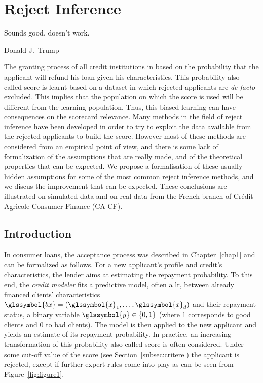 
\chapter{Reject Inference} \label{chap2}

\epigraph{Sounds good, doesn't work.}{Donald J.\ Trump}

\minitoc


\bigskip

The granting process of all credit institutions in based on the probability that the applicant will refund his loan given his characteristics. This probability also called \gls{score} is learnt based on a dataset in which rejected applicants are \textit{de facto} excluded. This implies that the population on which the \gls{score} is used will be different from the learning population. Thus, this biased learning can have consequences on the scorecard relevance. Many methods in the field of reject inference have been developed in order to try to exploit the data available from the rejected applicants to build the score. However most of these methods are considered from an empirical point of view, and there is some lack of formalization of the assumptions that are really made, and of the theoretical properties that can be expected. We propose a formalisation of these usually hidden assumptions for some of the most common reject inference methods, and we discus the improvement that can be expected. These conclusions are illustrated on simulated data and on real data from the French branch of Crédit Agricole Consumer Finance (CA CF).


\section{Introduction}


In consumer loans, the acceptance process was described in Chapter~\ref{chap1} and can be formalized as follows. For a new applicant's profile and credit's characteristics, the lender aims at estimating the repayment probability. To this end, the \textit{credit modeler} fits a predictive model, often a \gls{lr}, between already  financed  clients' characteristics $\glssymbol{bx}=(\glssymbol{x}_1,\ldots,\glssymbol{x}_d)$ and their repayment status, a binary variable $\glssymbol{y}\in\{0,1\}$ (where $1$ corresponds to good clients and $0$ to bad clients). The model is then applied to the new applicant and yields an estimate of its repayment probability. In practice, an increasing transformation of this probability also called score is often considered.
Under some cut-off value of the \gls{score} (see Section~\ref{subsec:critere}) the applicant is rejected, except if further expert rules come into play as can be seen from Figure~\ref{fig:figure1}.

